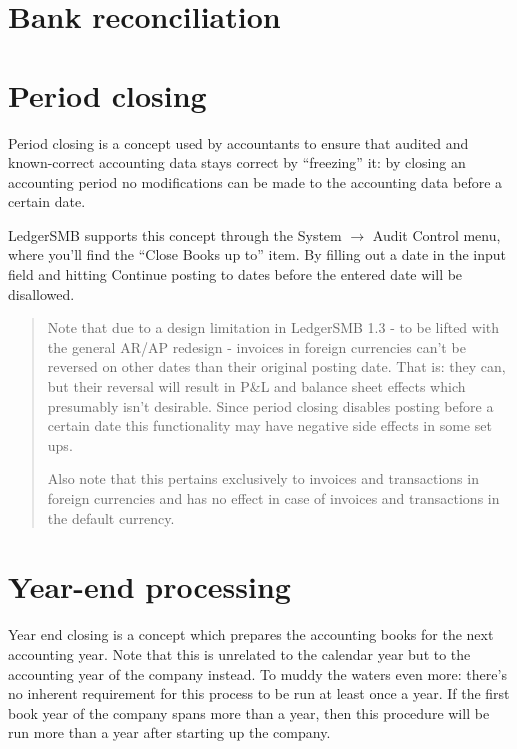 \section{Bank reconciliation}
\label{sec:Reconciliation}

\section{Period closing}

Period closing is a concept used by accountants to ensure that audited and
known-correct accounting data stays correct by ``freezing'' it: by closing
an accounting period no modifications can be made to the accounting data
before a certain date.

LedgerSMB supports this concept through the System $\rightarrow$ Audit Control
menu, where you'll find the ``Close Books up to'' item. By filling out a date
in the input field and hitting Continue posting to dates before the entered
date will be disallowed.


\begin{quotation}
Note that due to a design limitation in LedgerSMB 1.3 - to be lifted with the
general AR/AP redesign - invoices in foreign currencies can't be reversed on
other dates than their original posting date. That is: they can, but their
reversal will result in P\&L and balance sheet effects which presumably isn't
desirable. Since period closing disables posting before a certain date this
functionality may have negative side effects in some set ups.

Also note that this pertains exclusively to invoices and transactions in foreign
currencies and has no effect in case of invoices and transactions in the default
currency.
\end{quotation}

\section{Year-end processing}
\label{sec:YearEndProcessing}

Year end closing is a concept which prepares the accounting books for the next
accounting year. Note that this is unrelated to the calendar year but to the
accounting year of the company instead. To muddy the waters even more: there's
no inherent requirement for this process to be run at least once a year. If the
first book year of the company spans more than a year, then this procedure will
be run more than a year after starting up the company.


